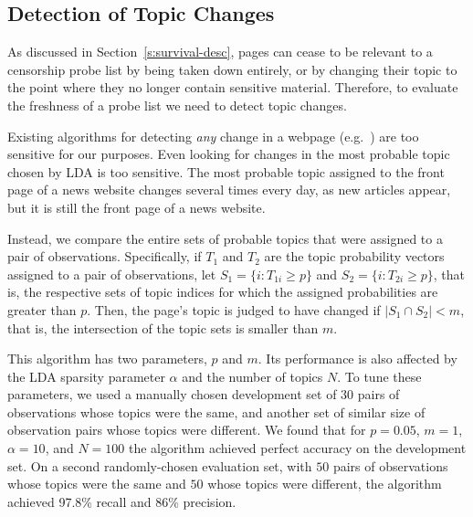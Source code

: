 \subsection{Detection of Topic Changes}
\label{s:topic_change}

As discussed in Section~\ref{s:survival-desc}, pages can cease to be
relevant to a censorship probe list by being taken down entirely, or
by changing their topic to the point where they no longer contain
sensitive material. Therefore, to evaluate the freshness of a probe
list we need to detect topic changes.

Existing algorithms for detecting \emph{any} change in a webpage
(e.g.~\cite{Chakravarthy2006CDN}) are too sensitive for our purposes.
Even looking for changes in the most probable topic chosen by LDA is
too sensitive. The most probable topic assigned to the front page of a
news website changes several times every day, as new articles appear,
but it is still the front page of a news website.

Instead, we compare the entire sets of probable topics that were
assigned to a pair of observations.  Specifically, if $T_1$ and $T_2$
are the topic probability vectors assigned to a pair of observations,
let $S_1 = \{ i : T_{1i} \ge p \}$ and $S_2 = \{ i : T_{2i} \ge p \}$,
that is, the respective sets of topic indices for which the assigned
probabilities are greater than $p$.  Then, the page's topic is judged
to have changed if $|S_1 \cap S_2| < m$, that is, the intersection of
the topic sets is smaller than $m$.

This algorithm has two parameters, $p$ and $m$. Its performance is
also affected by the LDA sparsity parameter $\alpha$ and the number of
topics $N$.  To tune these parameters, we used a manually chosen
development set of $30$ pairs of observations whose topics were the
same, and another set of similar size of observation pairs whose
topics were different. We found that for $p=0.05$, $m=1$, $\alpha=10$,
and $N=100$ the algorithm achieved perfect accuracy on the
development set.  On a second randomly-chosen evaluation set, with $50$
pairs of observations whose topics were the same and $50$ whose topics
were different, the algorithm achieved 97.8\% recall and
86\% precision.

